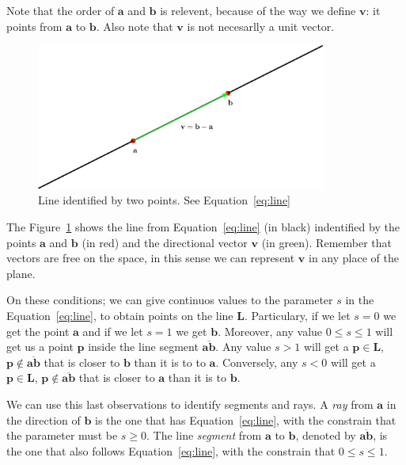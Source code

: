 Note that the order of $\mathbf{a}$ and $\mathbf{b}$ is relevent, because of the way we define $\mathbf{v}$: it points from $\mathbf{a}$ to $\mathbf{b}$.
Also note that $\mathbf{v}$ is not necesarlly a unit vector. 

\begin{figure}[htb]
  \centering
  \includegraphics[width=0.85\textwidth]{img/line}
  \caption{Line identified by two points. See Equation~\ref{eq:line} }
  \label{fig:line}
\end{figure}

The Figure~\ref{fig:line} shows the line from Equation~\ref{eq:line} (in black) indentified by the points $\mathbf{a}$ and $\mathbf{b}$ (in red) and the directional vector $\mathbf{v}$ (in green).
Remember that vectors are free on the space, in this sense we can represent $\mathbf{v}$ in any place of the plane.


On these conditions; we can give continuos values to the parameter $s$ in the Equation~\ref{eq:line}, to obtain points on the line $\mathbf{L}$.
Particulary, if we let $s = 0$ we get the point $\mathbf{a}$ and if we let $s = 1$ we get  
$\mathbf{b}$.
Moreover, any value $0 \leq s \leq 1$ will get us a point $\mathbf{p}$ inside the line segment $\overline{\mathbf{a} \mathbf{b}}$.
Any value $s > 1$ will get a $\mathbf{p} \in \mathbf{L}$, $\mathbf{p} \notin \overline{\mathbf{a} \mathbf{b}}$ that is closer to $\mathbf{b}$ than it is to to $\mathbf{a}$.
Conversely, any $s < 0$ will get a $\mathbf{p} \in \mathbf{L}$, $\mathbf{p} \notin \overline{\mathbf{a} \mathbf{b}}$ that is closer to $\mathbf{a}$ than it is to $\mathbf{b}$.

We can use this last observations to identify segments and rays.
A \emph{ray} from $\mathbf{a}$ in the direction of $\mathbf{b}$ is the one that has Equation~\ref{eq:line}, with the constrain that the parameter must be $s \geq 0$.
The line \emph{segment} from $\mathbf{a}$ to $\mathbf{b}$, denoted by $\overline{\mathbf{a} \mathbf{b}}$, is the one that also follows Equation~\ref{eq:line}, with the constrain that   $0 \leq s \leq 1$.

